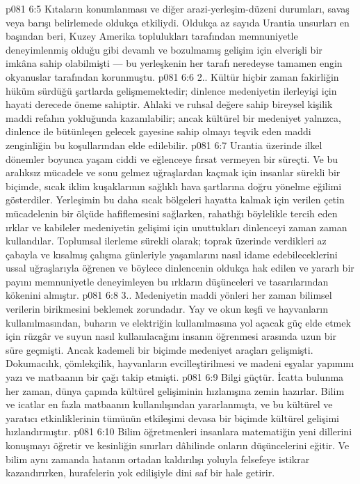 \vs p081 6:5 Kıtaların konumlanması ve diğer arazi\hyp{}yerleşim\hyp{}düzeni durumları, savaş veya barışı belirlemede oldukça etkiliydi. Oldukça az sayıda Urantia unsurları en başından beri, Kuzey Amerika toplulukları tarafından memnuniyetle deneyimlenmiş olduğu gibi devamlı ve bozulmamış gelişim için elverişli bir imkâna sahip olabilmişti --- bu yerleşkenin her tarafı neredeyse tamamen engin okyanuslar tarafından korunmuştu.
\vs p081 6:6 2.\bibnobreakspace {}. Kültür hiçbir zaman fakirliğin hüküm sürdüğü şartlarda gelişmemektedir; dinlence medeniyetin ilerleyişi için hayati derecede öneme sahiptir. Ahlaki ve ruhsal değere sahip bireysel kişilik maddi refahın yokluğunda kazanılabilir; ancak kültürel bir medeniyet yalnızca, dinlence ile bütünleşen gelecek gayesine sahip olmayı teşvik eden maddi zenginliğin bu koşullarından elde edilebilir.
\vs p081 6:7 Urantia üzerinde ilkel dönemler boyunca yaşam ciddi ve eğlenceye fırsat vermeyen bir süreçti. Ve bu aralıksız mücadele ve sonu gelmez uğraşlardan kaçmak için insanlar sürekli bir biçimde, sıcak iklim kuşaklarının sağlıklı hava şartlarına doğru yönelme eğilimi gösterdiler. Yerleşimin bu daha sıcak bölgeleri hayatta kalmak için verilen çetin mücadelenin bir ölçüde hafiflemesini sağlarken, rahatlığı böylelikle tercih eden ırklar ve kabileler medeniyetin gelişimi için unuttukları dinlenceyi zaman zaman kullandılar. Toplumsal ilerleme sürekli olarak; toprak üzerinde verdikleri az çabayla ve kısalmış çalışma günleriyle yaşamlarını nasıl idame edebileceklerini ussal uğraşlarıyla öğrenen ve böylece dinlencenin oldukça hak edilen ve yararlı bir payını memnuniyetle deneyimleyen bu ırkların düşünceleri ve tasarılarından kökenini almıştır.
\vs p081 6:8 3.\bibnobreakspace {}. Medeniyetin maddi yönleri her zaman bilimsel verilerin birikmesini beklemek zorundadır. Yay ve okun keşfi ve hayvanların kullanılmasından, buharın ve elektriğin kullanılmasına yol açacak güç elde etmek için rüzgâr ve suyun nasıl kullanılacağını insanın öğrenmesi arasında uzun bir süre geçmişti. Ancak kademeli bir biçimde medeniyet araçları gelişmişti. Dokumacılık, çömlekçilik, hayvanların evcilleştirilmesi ve madeni eşyalar yapımını yazı ve matbaanın bir çağı takip etmişti.
\vs p081 6:9 Bilgi güçtür. İcatta bulunma her zaman, dünya çapında kültürel gelişiminin hızlanışına zemin hazırlar. Bilim ve icatlar en fazla matbaanın kullanılışından yararlanmıştı, ve bu kültürel ve yaratıcı etkinliklerinin tümünün etkileşimi devasa bir biçimde kültürel gelişimi hızlandırmıştır.
\vs p081 6:10 Bilim öğretmenleri insanlara matematiğin yeni dillerini konuşmayı öğretir ve kesinliğin sınırları dâhilinde onların düşüncelerini eğitir. Ve bilim aynı zamanda hatanın ortadan kaldırılışı yoluyla felsefeye istikrar kazandırırken, hurafelerin yok edilişiyle dini saf bir hale getirir.
